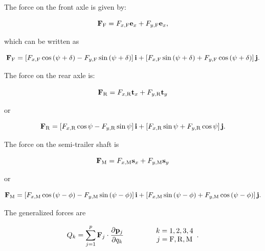 \documentclass[sublist,a4paper,twoside,11pt]{article}
\begin{document}
The force on the front axle is given by:

\begin{equation}
    {\bf F}_{\rm F} = F_{x,{\rm F}} {\bf e}_x + F_{y,{\rm F}} {\bf e}_x,
\end{equation}

which can be written as

\begin{equation} \label{ForceFront}
    {\bf F}_{\rm F} = \left[ F_{x,{\rm F}} \cos \left( \psi + \delta \right) - F_{y,{\rm F}} \sin \left( \psi + \delta \right) \right] {\bf i} + \left[ F_{x,{\rm F}} \sin \left( \psi + \delta \right) + F_{y,{\rm F}} \cos \left( \psi + \delta \right) \right] {\bf j}.
\end{equation}

The force on the rear axle is:

\begin{equation}
    {\bf F}_{\rm R} = F_{x,{\rm R}} {\bf t}_x + F_{y,{\rm R}} {\bf t}_y
\end{equation}

or

\begin{equation} \label{ForceRear}
    {\bf F}_{\rm R} = \left[ F_{x,{\rm R}} \cos \psi - F_{y,{\rm R}} \sin \psi \right] {\bf i} + \left[ F_{x,{\rm R}} \sin \psi + F_{y,{\rm R}} \cos \psi \right] {\bf j}.
\end{equation}

The force on the semi-trailer shaft is

\begin{equation}
    {\bf F}_{\rm M} = F_{x,{\rm M}} {\bf s}_x + F_{y,{\rm M}} {\bf s}_y
\end{equation}

or

\begin{equation} \label{ForceSemi}
    {\bf F}_{\rm M} = \left[ F_{x,{\rm M}} \cos \left( \psi - \phi \right) - F_{y,{\rm M}} \sin \left( \psi - \phi \right) \right] {\bf i} + \left[ F_{x,{\rm M}} \sin \left( \psi - \phi \right) + F_{y,{\rm M}} \cos \left( \psi - \phi \right) \right] {\bf j}.
\end{equation}

The generalized forces are

\begin{equation}
    Q_k = \sum_{j = 1} ^p {\bf F}_j \cdot \frac{\partial {\bf p}_j}{\partial q_k} \qquad \qquad \begin{array}{c} k = 1, 2, 3, 4 \\ j = {\rm F}, {\rm R}, {\rm M} \end{array}.
\end{equation}
\end{document}
